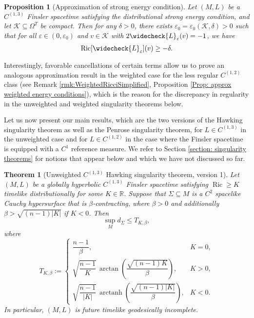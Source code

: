 \documentclass[a4paper,11pt]{article}
\numberwithin{equation}{section}
\theoremstyle{definition}
\theoremstyle{plain}
\newtheorem{Theorem}[Definition]{Theorem}
\newtheorem{Proposition}[Definition]{Proposition}
\newcommand{\eps}{\varepsilon}
\newcommand{\Ric}{\mathrm{Ric}}
\begin{document}
\begin{Proposition}[Approximation of strong energy condition]
    Let $(M,L)$ be a $C^{(1,3)}$ Finsler spacetime satisfying the distributional strong energy condition, and let $\mathcal{K} \subseteq \Omega^T$ be compact.
    Then for any $\delta >0$, there exists $\eps_0 =\eps_0(\mathcal{K},\delta) >0$ such that for all $\eps \in (0,\eps_0)$ and $v \in \mathcal{K}$ with $2 \widecheck{L}_\eps(v)=-1$, we have
    \begin{equation*}
        \Ric[\widecheck{L}_\eps](v) \ge - \delta.
    \end{equation*}
\end{Proposition}
Interestingly, favorable cancellations of certain terms allow us to prove an analogous approximation result in the weighted case for the less regular $C^{(1,2)}$ class (see Remark \ref{rmk:WeightedRicciSimplified}, Proposition \ref{Prop: approx weighted energy conditions}), which is the reason for the discrepancy in regularity in the unweighted and weighted singularity theorems below.

Let us now present our main results, which are the two versions of the Hawking singularity theorem as well as the Penrose singularity theorem, for $L \in C^{(1,3)}$ in the unweighted case and for $L \in C^{(1,2)}$ in the case where the Finsler spacetime is equipped with a $C^1$ reference measure. 
We refer to Section \ref{section: singularity theorems} for notions that appear below and which we have not discussed so far.

\begin{Theorem}[Unweighted $C^{(1,3)}$ Hawking singularity theorem,
version 1]
Let $(M,L)$ be a globally hyperbolic $C^{(1,3)}$
Finsler spacetime satisfying
$\operatorname{Ric}\geq K$ timelike distributionally
for some $K\in\mathbb R$.
Suppose that $\Sigma\subseteq M$ is a $C^2$ spacelike
Cauchy hypersurface that is $\beta$-contracting,
where $\beta>0$ and additionally
$\beta>\sqrt{(n-1)|K|}$ if $K<0$. Then
\begin{equation*}
    \sup_M d_\Sigma\leq T_{K,\beta},
\end{equation*}
where 
\begin{equation*}
    T_{K,\beta}:=
    \begin{cases}
        \dfrac{n-1}{\beta},
        & K=0,\\[1.2ex]
        \sqrt{\dfrac{n-1}{K}}\,
        \operatorname{arctan}\!
        \left(\dfrac{\sqrt{(n-1)K}}{\beta}\right),
        & K>0,\\[1.6ex]
        \sqrt{\dfrac{n-1}{|K|}}\,
        \operatorname{arctanh}\!
        \left(\dfrac{\sqrt{(n-1)|K|}}{\beta}\right),
        & K<0.
    \end{cases}
\end{equation*}
In particular, $(M,L)$ is future timelike geodesically
incomplete.
\end{Theorem}
\end{document}

